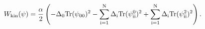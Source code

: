 \begin{equation}
W_{{\rm {kin}}}(\psi )=\frac{\alpha }{2}\left( -\Delta _{0}{\rm {Tr}(\psi
_{00})^{2}-\sum_{i=1}^{N}\Delta _{i}{Tr}(\psi
_{ii}^{0})^{2}+\sum_{i=1}^{N}\Delta _{i}{Tr}(\psi _{ii}^{2})^{2}}\right) .
\end{equation}

